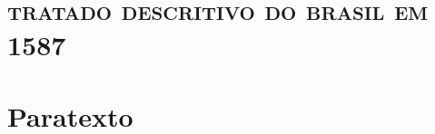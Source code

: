 


\part[tratado descritivo do brasil em 1587]{\textsc{tratado descritivo do brasil em 1587}} 





\part{Paratexto}

